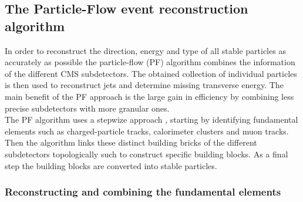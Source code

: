 \subsection{The Particle-Flow event reconstruction algorithm} \label{subsec::PF}

In order to reconstruct the direction, energy and type of all stable particles as accurately as possible the particle-flow (PF) algorithm combines the information of the different CMS subdetectors. The obtained collection of individual particles is then used to reconstruct jets and determine missing transverse energy.
The main benefit of the PF approach is the large gain in efficiency by combining less precise subdetectors with more granular ones.
\\
The PF algorithm uses a stepwize approach \cite{}, starting by identifying fundamental elements such as charged-particle tracks, calorimeter clusters and muon tracks. Then the algorithm links these distinct building bricks of the different subdetectors topologically such to construct specific building blocks. As a final step the building blocks are converted into stable particles.

\subsubsection*{Reconstructing and combining the fundamental elements}

